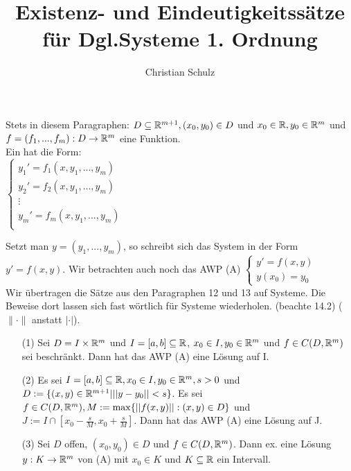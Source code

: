 \documentclass{article}
\title{Existenz- und Eindeutigkeitssätze für Dgl.Systeme 1. Ordnung}
\author{Christian Schulz}
\begin{document}
\maketitle

Stets in diesem Paragraphen: $D \subseteq \mathbb{R}^{m+1}, (x_0,y_0) \in D$ und $x_0 \in \mathbb{R}, 
y_0 \in \mathbb{R}^m$ und $f=(f_1,...,f_m): D \to \mathbb{R}^m$ eine Funktion.\\
Ein  hat die Form: \\
$
\begin{cases} 
y_1' = f_1(x,y_1,...,y_m) \\
y_2' = f_2(x,y_1,...,y_m) \\
\vdots \\
y_m' = f_m(x,y_1,...,y_m)\\ 
\end{cases}$

Setzt man $y=(y_1,...,y_m)$, so schreibt sich das System in der Form $y' = f(x,y)$. Wir 
betrachten auch noch das AWP (A) $\begin{cases} y' = f(x,y) \\ y(x_0) = y_0 \end{cases}$ \\
Wir übertragen die Sätze aus den Paragraphen 12 und 13 auf Systeme. Die Beweise dort lassen sich fast wörtlich für Systeme wiederholen. (beachte 14.2) ($\|\cdot\|$ anstatt $|\cdot|$).

\begin{satz} [Peano]


\begin{itemize}
\item[(1)] 
Sei $D=I \times \mathbb{R}^m$ und $I=[a,b] \subseteq \mathbb{R}$, $x_0 \in I, y_0 \in \mathbb{R}^m$ und $ f \in C(D,\mathbb{R}^m)$ sei beschränkt. Dann hat das AWP (A) eine Lösung auf I.

\item[(2)] 
Es sei $I = [a,b] \subseteq \mathbb{R}, x_0 \in I, y_0 \in \mathbb{R}^m, s > 0$ und 
$D:=\{(x,y) \in \mathbb{R}^{m+1} | ||y-y_0|| < s\}$.
Es sei $f \in C(D,\mathbb{R}^m), M := \max \{ ||f(x,y)|| : (x,y) \in D \}$ und 
$J := I \cap [x_0-\frac{s}{M},x_0+\frac{s}{M}].$ Dann hat das AWP (A) eine Lösung auf J.

\item[(3)] Sei $D$ offen, $(x_0,y_0) \in D$ und $f \in C(D, \mathbb{R}^m)$. Dann ex. eine Lösung 
$y: K \to \mathbb{R}^m$ von (A) mit $x_0 \in K$ und $ K \subseteq \mathbb{R}$ ein Intervall.
\end{itemize}
\end{satz}
\end{document}
